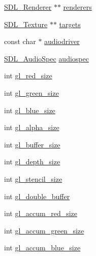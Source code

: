 \begin{DoxyCompactItemize}
\item 
\mbox{\hyperlink{_s_d_l__render_8h_aaf0bf7d020754fc614fe06552ea4d5d4}{S\+D\+L\+\_\+\+Renderer}} $\ast$$\ast$ \mbox{\hyperlink{struct_s_d_l_test___common_state_aeb35b7f12f63256c92a9813e682043c1}{renderers}}
\item 
\mbox{\hyperlink{_s_d_l__render_8h_a17850d7f1f5de457727cb3cf66b3a7f5}{S\+D\+L\+\_\+\+Texture}} $\ast$$\ast$ \mbox{\hyperlink{struct_s_d_l_test___common_state_a3fcf7d8f0f8d2f2351a75b5966cf9fe4}{targets}}
\item 
const char $\ast$ \mbox{\hyperlink{struct_s_d_l_test___common_state_ae51671cdec7979ca844f19b650b75300}{audiodriver}}
\item 
\mbox{\hyperlink{struct_s_d_l___audio_spec}{S\+D\+L\+\_\+\+Audio\+Spec}} \mbox{\hyperlink{struct_s_d_l_test___common_state_a2f73162e6bfe149141192fa49717d805}{audiospec}}
\item 
int \mbox{\hyperlink{struct_s_d_l_test___common_state_a33772305944410d726908efb5e0663ce}{gl\+\_\+red\+\_\+size}}
\item 
int \mbox{\hyperlink{struct_s_d_l_test___common_state_a716c97e5b80ee96018b014afec2d19ff}{gl\+\_\+green\+\_\+size}}
\item 
int \mbox{\hyperlink{struct_s_d_l_test___common_state_aff43a763af98b8eb651c41ec931e5d93}{gl\+\_\+blue\+\_\+size}}
\item 
int \mbox{\hyperlink{struct_s_d_l_test___common_state_a2b6e86fd695d84f12db148dcf3b2fcb5}{gl\+\_\+alpha\+\_\+size}}
\item 
int \mbox{\hyperlink{struct_s_d_l_test___common_state_a7e7ea32a3ba51db836b3aa7f31163921}{gl\+\_\+buffer\+\_\+size}}
\item 
int \mbox{\hyperlink{struct_s_d_l_test___common_state_a9a16800e0ec09d4b9b55e9e6bb973abc}{gl\+\_\+depth\+\_\+size}}
\item 
int \mbox{\hyperlink{struct_s_d_l_test___common_state_af27830ef5d5ed9cc8e90088a69f4d78f}{gl\+\_\+stencil\+\_\+size}}
\item 
int \mbox{\hyperlink{struct_s_d_l_test___common_state_a74c88cb0dcd1e968db763152e0b1e068}{gl\+\_\+double\+\_\+buffer}}
\item 
int \mbox{\hyperlink{struct_s_d_l_test___common_state_ae9d55cebbc3f4e486f4f77a35de4e4dd}{gl\+\_\+accum\+\_\+red\+\_\+size}}
\item 
int \mbox{\hyperlink{struct_s_d_l_test___common_state_a4c20729a710f51ed67bdd1910da1a16b}{gl\+\_\+accum\+\_\+green\+\_\+size}}
\item 
int \mbox{\hyperlink{struct_s_d_l_test___common_state_a3d23ac90e722af5098e7869a7302c119}{gl\+\_\+accum\+\_\+blue\+\_\+size}}

\end{DoxyCompactItemize}
